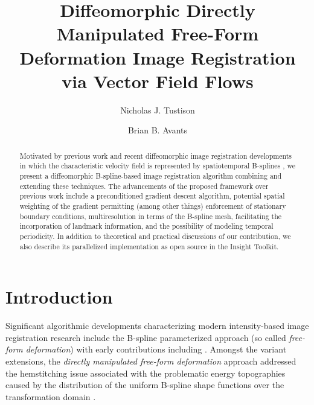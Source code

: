 \documentclass{llncs}
\begin{document}
%
\frontmatter          %
%

\mainmatter              %
%
\title{Diffeomorphic Directly Manipulated Free-Form Deformation Image Registration via Vector Field Flows}
%
%
\author{Nicholas J. Tustison \and Brian B. Avants}
%
%


\maketitle              %

\begin{abstract}
Motivated by previous work \cite{tustison2009} and 
recent diffeomorphic image registration developments in which the 
characteristic velocity field is represented by spatiotemporal B-splines 
\cite{de-craene2011}, we present a diffeomorphic B-spline-based
image registration algorithm combining and extending these techniques.  
The advancements of the proposed framework
over previous work include a preconditioned gradient descent algorithm, 
potential spatial weighting 
of the gradient permitting (among other things) enforcement of 
stationary boundary conditions, multiresolution in terms of the B-spline
mesh, facilitating the incorporation of landmark information, 
and the possibility of modeling temporal periodicity.  In addition to
theoretical and practical discussions of our contribution, we also describe 
its parallelized implementation as open source in the Insight Toolkit.  
\end{abstract}

\section{Introduction}
Significant algorithmic developments characterizing modern intensity-based
image registration research include the B-spline parameterized approach
(so called {\em free-form deformation}) with early contributions 
including \cite{szeliski1997,thevenaz1998,rueckert1999}.  Amongst the 
variant extensions, the 
{\em directly manipulated free-form deformation} approach  
 addressed the hemstitching issue associated with the
problematic energy topographies caused by the distribution of the uniform 
B-spline shape functions over the transformation domain \cite{tustison2009}.
\end{document}
